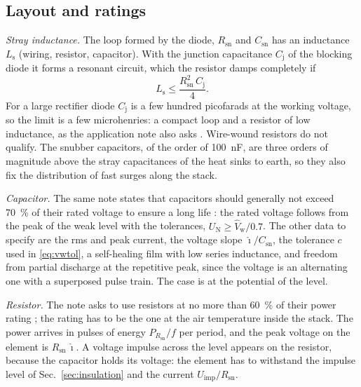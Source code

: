\documentclass[10pt,a4paper]{scrartcl}
\newcommand{\Csn}{C_\mathrm{sn}}
\newcommand{\Rsn}{R_\mathrm{sn}}
\newcommand{\Vw}{\hat V_\mathrm{w}}
\begin{document}
\subsection{Layout and ratings}
\label{sec:ratings}
\emph{Stray inductance.} The loop formed by the diode, $\Rsn$ and $\Csn$ has an inductance $L_\mathrm{s}$ (wiring, resistor, capacitor). With the junction capacitance $C_\mathrm{j}$ of the blocking diode it forms a resonant circuit, which the resistor damps completely if
\begin{equation}
L_\mathrm{s} \le \frac{\Rsn^2\,C_\mathrm{j}}{4} .
\label{eq:ls}
\end{equation}
For a large rectifier diode $C_\mathrm{j}$ is a few hundred picofarads at the working voltage, so the limit is a few microhenries: a compact loop and a resistor of low inductance, as the application note also asks \cite[Sec.~4.4]{an6481}. Wire-wound resistors do not qualify. The snubber capacitors, of the order of \SI{100}{\nano\farad}, are three orders of magnitude above the stray capacitances of the heat sinks to earth, so they also fix the distribution of fast surges along the stack.

\emph{Capacitor.} The same note states that capacitors should generally not exceed \SI{70}{\percent} of their rated voltage to ensure a long life \cite[Sec.~4.4]{an6481}: the rated voltage follows from the peak of the weak level with the tolerances, $U_\mathrm{N} \ge \Vw/0.7$. The other data to specify are the rms and peak current, the voltage slope $\hat\imath/\Csn$, the tolerance $c$ used in \eqref{eq:vwtol}, a self-healing film with low series inductance, and freedom from partial discharge at the repetitive peak, since the voltage is an alternating one with a superposed pulse train. The case is at the potential of the level.

\emph{Resistor.} The note asks to use resistors at no more than \SI{60}{\percent} of their power rating \cite[Sec.~4.4]{an6481}; the rating has to be the one at the air temperature inside the stack. The power arrives in pulses of energy $P_{\Rsn}/f$ per period, and the peak voltage on the element is $\Rsn\,\hat\imath$. A voltage impulse across the level appears on the resistor, because the capacitor holds its voltage: the element has to withstand the impulse level of Sec.~\ref{sec:insulation} and the current $U_\mathrm{imp}/\Rsn$.
\end{document}
